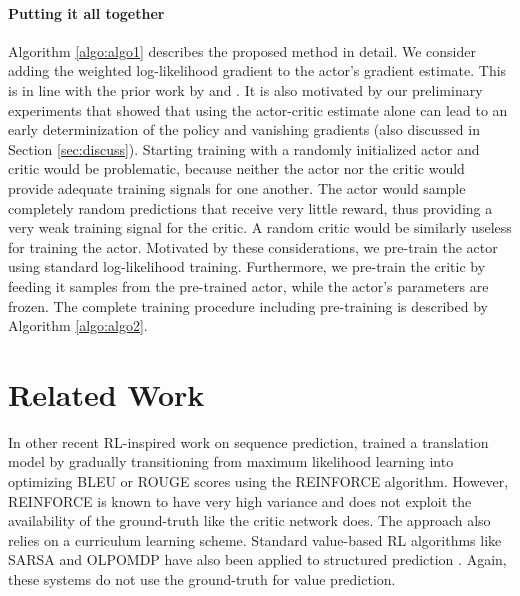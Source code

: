 \documentclass{article} \usepackage{iclr2017_conference,times}
\begin{document}
\paragraph{Putting it all together}

Algorithm \ref{algo:algo1} describes the proposed method in detail.
We consider adding the weighted
log-likelihood gradient to the actor's gradient estimate. This is in line with
the prior work by \citep{ranzato2015sequence} and \citep{shen2015minimum}. It is
also motivated by our preliminary experiments that showed that using the
actor-critic estimate alone can lead to an early determinization of the policy
and vanishing gradients (also discussed in Section \ref{sec:discuss}).
Starting training with a randomly initialized actor and critic would be
problematic,
 because neither the actor nor the critic would provide adequate
training signals for one another.
 The actor would sample completely random
predictions that receive very little reward,
 thus providing a very weak
training signal for the critic.
 A random critic would be similarly useless
for training the actor. Motivated by these considerations, 
 we pre-train the
actor using standard log-likelihood training. Furthermore, we
 pre-train the
critic by feeding it samples from the pre-trained actor, while the actor's
parameters are frozen. The complete training procedure including pre-training
is described by Algorithm \ref{algo:algo2}.


\section{Related Work}

In other recent RL-inspired work on sequence prediction, \citet{ranzato2015sequence}
trained a translation model 
by gradually transitioning from maximum likelihood learning into
optimizing BLEU or ROUGE scores using the REINFORCE algorithm.
However, REINFORCE is known to have very high variance
and does not exploit the availability of the ground-truth like the critic
network does. The approach also relies on a curriculum learning scheme.
Standard value-based RL algorithms like SARSA and OLPOMDP have also been applied to structured
prediction \citep{maes2009structured}. Again, these systems do not
use the ground-truth for value prediction.
\end{document}
